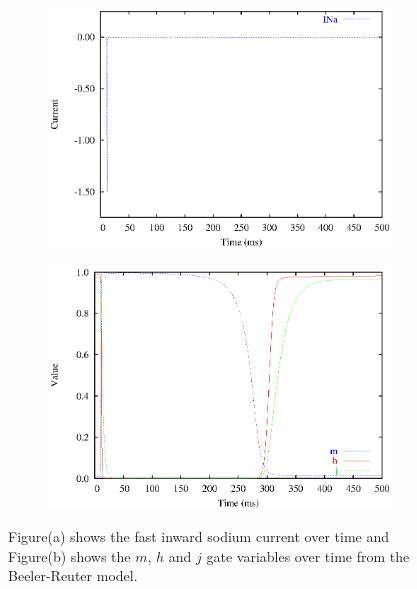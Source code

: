 \begin{figure}[hbtp]
  \centering
  \begin{subfigure}[b]{0.45\linewidth}
    \centering
    \includegraphics[width=\textwidth]{cardiac_electrophysiology/epsfiles/BR_INa.eps}
    \caption{}
  \end{subfigure}
  \hfill
  \begin{subfigure}[b]{0.45\linewidth}
    \centering
    \includegraphics[width=\linewidth]{cardiac_electrophysiology/epsfiles/BR_mhj.eps} \\
    \caption{}
  \end{subfigure}
  \caption[Fast inward sodium current from the Beeler-Reuter model]{Figure(a) shows the
    fast inward sodium current over time and Figure(b) shows the $m$, $h$ and
    $j$ gate variables over time from the Beeler-Reuter model.}
  \label{fig:BR_NA_traces}
\end{figure}
%
